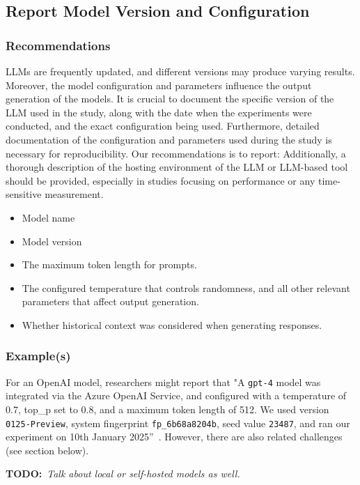 \documentclass[11pt]{article}
\newcommand{\todo}[1]{{\textbf{TODO:}\ \textit{#1}}} %
\begin{document}
\subsection{Report Model Version and Configuration}

\subsubsection{Recommendations}

LLMs are frequently updated, and different versions may produce varying results.
Moreover, the model configuration and parameters influence the output generation of the models.
It is crucial to document the specific version of the LLM used in the study, along with the date when the experiments were conducted, and the exact configuration being used.
Furthermore, detailed documentation of the configuration and parameters used during the study is necessary for reproducibility. 
Our recommendations is to report:
Additionally, a thorough description of the hosting environment of the LLM or LLM-based tool should be provided, especially in studies focusing on performance or any time-sensitive measurement.

\begin{itemize}
\item Model name
\item Model version
\item The maximum token length for prompts.
\item The configured temperature that controls randomness, and all other relevant parameters that affect output generation.
\item Whether historical context was considered when generating responses.
\end{itemize}


\subsubsection{Example(s)}

For an OpenAI model, researchers might report that "A  \texttt{gpt-4} model was integrated via the Azure OpenAI Service, and configured with a temperature of 0.7, top\_p set to 0.8, and a maximum token length of 512. We used version \texttt{0125-Preview}, system fingerprint \texttt{fp\_6b68a8204b}, seed value \texttt{23487}, and ran our experiment on 10th January 2025''~\cite{OpenAI25, Azure25}.
However, there are also related challenges (see section below).

\todo{Talk about local or self-hosted models as well.}
\end{document}
